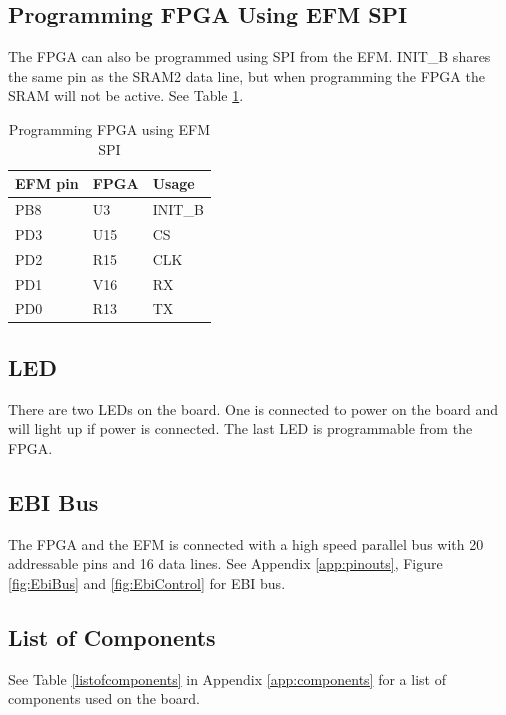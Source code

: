 \subsection{Programming FPGA Using EFM SPI}
The FPGA can also be programmed using SPI from the EFM.
INIT\_B shares the same pin as the SRAM2 data line, but when programming the FPGA the SRAM will not be active.
See Table \ref{tab:SpiProgrammer}.

\begin{table}[]
    \centering
    \begin{tabular}{lll}
        EFM pin & FPGA & Usage   \\
        \hline
        PB8     & U3   & INIT\_B \\
        PD3     & U15  & CS      \\
        PD2     & R15  & CLK     \\
        PD1     & V16  & RX      \\
        PD0     & R13  & TX
    \end{tabular}
    \caption{Programming FPGA using EFM SPI}
    \label{tab:SpiProgrammer}
\end{table}

\subsection{LED}
There are two LEDs on the board.
One is connected to power on the board and will light up if power is connected.
The last LED is programmable from the FPGA.

\subsection{EBI Bus}
The FPGA and the EFM is connected with a high speed parallel bus with 20 addressable pins and 16 data lines.
See Appendix \ref{app:pinouts}, Figure \ref{fig:EbiBus} and \ref{fig:EbiControl} for EBI bus.

\subsection{List of Components}
See Table \ref{listofcomponents} in Appendix \ref{app:components} for a list of components used on the board.

